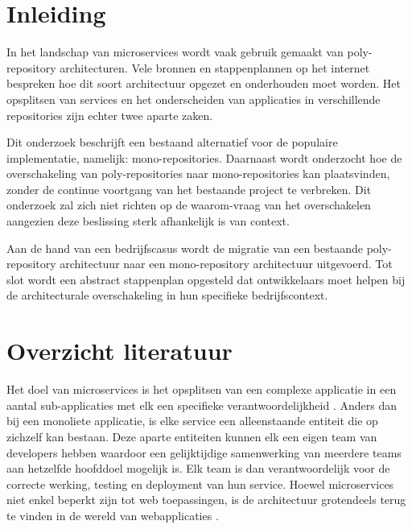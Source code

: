\documentclass{hogent-article}
\affiliation{
  \textsuperscript{1} \href{mailto:liam.goethals@student.hogent.be}{liam.goethals@student.hogent.be}}
\begin{document}
\flushbottom
\maketitle
\tableofcontents
\thispagestyle{empty}
\section{Inleiding}
In het landschap van microservices wordt vaak gebruik gemaakt van poly-repository architecturen. Vele bronnen en stappenplannen op het internet bespreken hoe dit soort architectuur opgezet en onderhouden moet worden. Het opsplitsen van services en het onderscheiden van applicaties in verschillende repositories zijn echter twee aparte zaken.

Dit onderzoek beschrijft een bestaand alternatief voor de populaire implementatie, namelijk: mono-repositories. Daarnaast wordt onderzocht hoe de overschakeling van poly-repositories naar mono-repositories kan plaatsvinden, zonder de continue voortgang van het bestaande project te verbreken. 
Dit onderzoek zal zich niet richten op de waarom-vraag van het overschakelen aangezien deze beslissing sterk afhankelijk is van context. 

Aan de hand van een bedrijfscasus wordt de migratie van een bestaande poly-repository architectuur naar een mono-repository architectuur uitgevoerd. Tot slot wordt een abstract stappenplan opgesteld dat ontwikkelaars moet helpen bij de architecturale overschakeling in hun specifieke bedrijfscontext.

\section{Overzicht literatuur}
Het doel van microservices is het opsplitsen van een complexe applicatie in een aantal sub-applicaties met elk een specifieke verantwoordelijkheid \autocite{Thoenes2015}. Anders dan bij een monoliete applicatie, is elke service een alleenstaande entiteit die op zichzelf kan bestaan. Deze aparte entiteiten kunnen elk een eigen team van developers hebben waardoor een gelijktijdige samenwerking van meerdere teams aan hetzelfde hoofddoel mogelijk is. Elk team is dan verantwoordelijk voor de correcte werking, testing en deployment van hun service.
Hoewel microservices niet enkel beperkt zijn tot web toepassingen, is de architectuur grotendeels terug te vinden in de wereld van webapplicaties \autocite{Richardson2019}.
\end{document}
